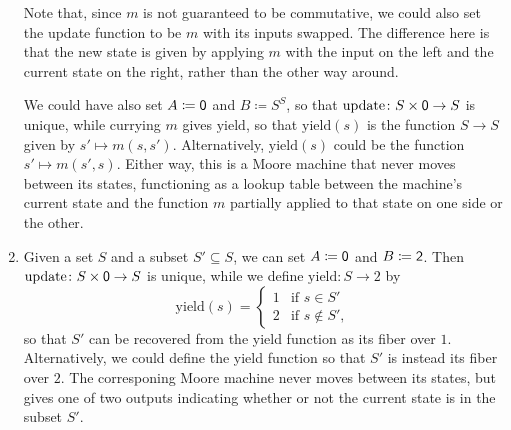 \documentclass[Book-Poly]{subfiles}
\begin{document}
\begin{exercise}
\begin{solution}
\begin{enumerate}
    Note that, since $m$ is not guaranteed to be commutative, we could also set the update function to be $m$ with its inputs swapped.
    The difference here is that the new state is given by applying $m$ with the input on the left and the current state on the right, rather than the other way around.
    
    We could have also set $A \coloneqq \textsf{0}$ and $B \coloneqq S^S$, so that $\text{update} \colon S \times \textsf{0} \to S$ is unique, while currying $m$ gives $\text{yield}$, so that $\text{yield}(s)$ is the function $S \to S$ given by $s' \mapsto m(s, s')$.
    Alternatively, $\text{yield}(s)$ could be the function $s' \mapsto m(s', s)$.
    Either way, this is a Moore machine that never moves between its states, functioning as a lookup table between the machine's current state and the function $m$ partially applied to that state on one side or the other.
    
    \item Given a set $S$ and a subset $S' \subseteq S$, we can set $A \coloneqq \textsf{0}$ and $B \coloneqq \textsf{2}$.
    Then $\text{update} \colon S \times \textsf{0} \to S$ is unique, while we define $\text{yield} \colon S \to 2$ by
    \[
        \text{yield}(s) =
        \begin{cases}
            1 & \text{if } s \in S' \\
            2 & \text{if } s \notin S',
        \end{cases}
    \]
    so that $S'$ can be recovered from the yield function as its fiber over $1$.
    Alternatively, we could define the yield function so that $S'$ is instead its fiber over $2$.
    The corresponing Moore machine never moves between its states, but gives one of two outputs indicating whether or not the current state is in the subset $S'$.
\end{enumerate}
\end{solution}
\end{exercise}
\end{document}
